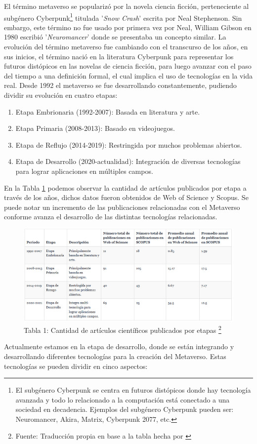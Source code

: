 \documentclass[a4paper,10pt]{article}
\begin{document}
	El término metaverso se popularizó por la novela ciencia ficción, perteneciente al subgénero Cyberpunk\footnote{El subgénero Cyberpunk se centra en futuros distópicos donde hay tecnología avanzada y todo lo relacionado a la computación está conectado a una sociedad en decadencia. Ejemplos del subgénero Cyberpunk pueden ser: Neuromancer, Akira, Matrix, Cyberpunk 2077, etc.} titulada '\textit{Snow Crash}' escrita por Neal Stephenson. Sin embargo, este término no fue usado por primera vez por Neal, William Gibson en 1980 escribió '\textit{Neuromancer}' donde se presentaba un concepto similar.
	La evolución del término metaverso fue cambiando con el transcurso de los años, en sus inicios, el término nació en la literatura Cyberpunk para representar los futuros distópicos en las novelas de ciencia ficción, para luego avanzar con el paso del tiempo a una definición formal, el cual implica el uso de tecnologías en la vida real. Desde 1992 el metaverso se fue desarrollando constantemente, pudiendo dividir su evolución en cuatro etapas:
	\begin{enumerate}
		\item Etapa Embrionaria (1992-2007): Basada en literatura y arte.
		\item Etapa Primaria (2008-2013): Basado en videojuegos.
		\item Etapa de Reflujo (2014-2019): Restringida por muchos problemas abiertos.
		\item Etapa de Desarrollo (2020-actualidad): Integración de diversas tecnologías para lograr aplicaciones en múltiples campos.
	\end{enumerate}
	En la Tabla \ref{fig:tabla_publicaciones} podemos observar la cantidad de artículos publicados por etapa a través de los años, dichos datos fueron obtenidos de Web of Science y Scopus. Se puede notar un incremento de las publicaciones relacionadas con el Metaverso conforme avanza el desarrollo de las distintas tecnologías relacionadas. 
	\newpage
	\begin{figure}[h]
		\centering
		\includegraphics[width=1.0\textwidth]{tablaPublicaciones.PNG}
		\caption[Tabla 1:]{Tabla 1: Cantidad de artículos científicos publicados por etapas \footnote{Fuente: Traducción propia en base a la tabla hecha por \textcite{ning2023survey}}}
		\label{fig:tabla_publicaciones}
	\end{figure}
	Actualmente estamos en la etapa de desarrollo, donde se están integrando y desarrollando diferentes tecnologías para la creación del Metaverso. Estas tecnologías se pueden dividir en cinco aspectos:
\end{document}
